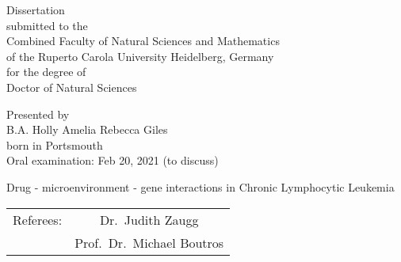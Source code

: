 \documentclass[11pt, a4paper, twosided]{book}
\begin{document}

\thispagestyle{empty}
  \begin{center}
  {\Large{Dissertation\\
    submitted to the\\
    Combined Faculty of Natural Sciences and Mathematics\\
    of the Ruperto Carola University Heidelberg, Germany\\
    for the degree of\\
    Doctor of Natural Sciences\\}} \vspace*{\fill}

  \Large{Presented by} \\\vspace{0.5cm}
  \Large{B.A. Holly Amelia Rebecca Giles} \\
  \Large{born in Portsmouth} \\
  \Large{Oral examination: Feb 20, 2021 (to discuss)}

\end{center}
\newpage\null\thispagestyle{empty}\newpage


\pagebreak
\thispagestyle{empty}
\null
\begin{center}
\Large{Drug - microenvironment - gene interactions in Chronic Lymphocytic Leukemia} \\
\vspace*{\fill}
\begin{tabular}{ c c }
Referees: & Dr.~Judith Zaugg \\
          & Prof.~Dr.~Michael Boutros
\end{tabular}
\end{center}
\newpage\null\thispagestyle{empty}\newpage

\end{document}

